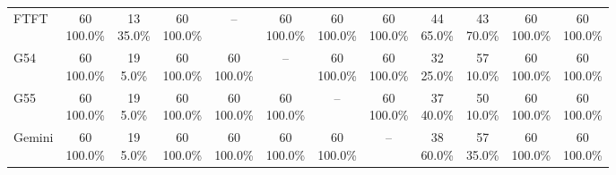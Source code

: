 \documentclass[11pt]{article}
\begin{document}
\begin{table}[H]
{\begin{tabular}{lccccccccccc}
FTFT & \shortstack{60\\100.0\%} & \shortstack{13\\35.0\%} & \shortstack{60\\100.0\%} & -- & \shortstack{60\\100.0\%} & \shortstack{60\\100.0\%} & \shortstack{60\\100.0\%} & \shortstack{44\\65.0\%} & \shortstack{43\\70.0\%} & \shortstack{60\\100.0\%} & \shortstack{60\\100.0\%} \\
G54 & \shortstack{60\\100.0\%} & \shortstack{19\\5.0\%} & \shortstack{60\\100.0\%} & \shortstack{60\\100.0\%} & -- & \shortstack{60\\100.0\%} & \shortstack{60\\100.0\%} & \shortstack{32\\25.0\%} & \shortstack{57\\10.0\%} & \shortstack{60\\100.0\%} & \shortstack{60\\100.0\%} \\
G55 & \shortstack{60\\100.0\%} & \shortstack{19\\5.0\%} & \shortstack{60\\100.0\%} & \shortstack{60\\100.0\%} & \shortstack{60\\100.0\%} & -- & \shortstack{60\\100.0\%} & \shortstack{37\\40.0\%} & \shortstack{50\\10.0\%} & \shortstack{60\\100.0\%} & \shortstack{60\\100.0\%} \\
Gemini & \shortstack{60\\100.0\%} & \shortstack{19\\5.0\%} & \shortstack{60\\100.0\%} & \shortstack{60\\100.0\%} & \shortstack{60\\100.0\%} & \shortstack{60\\100.0\%} & -- & \shortstack{38\\60.0\%} & \shortstack{57\\35.0\%} & \shortstack{60\\100.0\%} & \shortstack{60\\100.0\%} \\

\end{tabular}}
\end{table}
\end{document}
